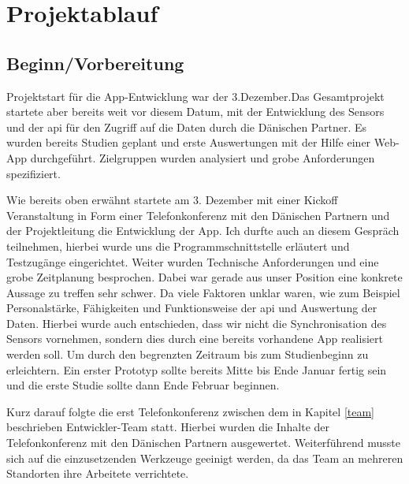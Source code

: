 \section{Projektablauf}
\subsection{Beginn/Vorbereitung}\label{kapBegin}
Projektstart für die App-Entwicklung  war der 3.Dezember.Das Gesamtprojekt startete aber bereits weit vor diesem Datum, mit der Entwicklung des Sensors und der \ac{api} für den Zugriff auf die Daten durch die Dänischen Partner. Es wurden bereits Studien geplant und erste Auswertungen mit der Hilfe einer Web-App durchgeführt. Zielgruppen wurden analysiert und grobe Anforderungen spezifiziert.

Wie bereits oben erwähnt startete am 3. Dezember mit einer Kickoff Veranstaltung in Form einer Telefonkonferenz mit den Dänischen Partnern und der Projektleitung die Entwicklung der App. Ich durfte auch an diesem Gespräch teilnehmen, hierbei wurde uns die Programmschnittstelle erläutert und Testzugänge eingerichtet.
Weiter wurden Technische Anforderungen  und eine grobe Zeitplanung besprochen. Dabei war gerade aus unser Position eine konkrete Aussage zu treffen sehr schwer. Da viele Faktoren unklar waren, wie zum Beispiel Personalstärke, Fähigkeiten und Funktionsweise der \ac{api} und Auswertung der Daten.
Hierbei wurde auch entschieden, dass wir nicht die Synchronisation des Sensors vornehmen, sondern dies durch eine bereits vorhandene App realisiert werden soll. Um durch den begrenzten Zeitraum bis zum Studienbeginn zu erleichtern. Ein erster Prototyp sollte bereits Mitte bis Ende Januar fertig sein und die erste Studie sollte dann Ende Februar beginnen.

Kurz darauf folgte die erst Telefonkonferenz zwischen dem in Kapitel \ref{team} beschrieben Entwickler-Team statt. Hierbei wurden die Inhalte der Telefonkonferenz mit den Dänischen Partnern ausgewertet.%
Weiterführend musste sich auf die einzusetzenden  Werkzeuge geeinigt werden, da das Team an mehreren Standorten ihre Arbeitete verrichtete.

